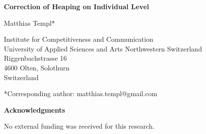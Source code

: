 \documentclass[12pt]{article}
\begin{document}
\begin{center}

\vspace*{2cm}

{\LARGE \textbf{Correction of Heaping on Individual Level}}

\vspace{2cm}

{\large Matthias Templ*}

\vspace{1cm}

Institute for Competitiveness and Communication\\
University of Applied Sciences and Arts Northwestern Switzerland\\
Riggenbachstrasse 16\\
4600 Olten, Solothurn\\
Switzerland

\vspace{1.5cm}

*Corresponding author: matthias.templ@gmail.com

\vspace{3cm}

\textbf{Acknowledgments}

\vspace{0.5cm}

No external funding was received for this research.

\end{center}
\end{document}
